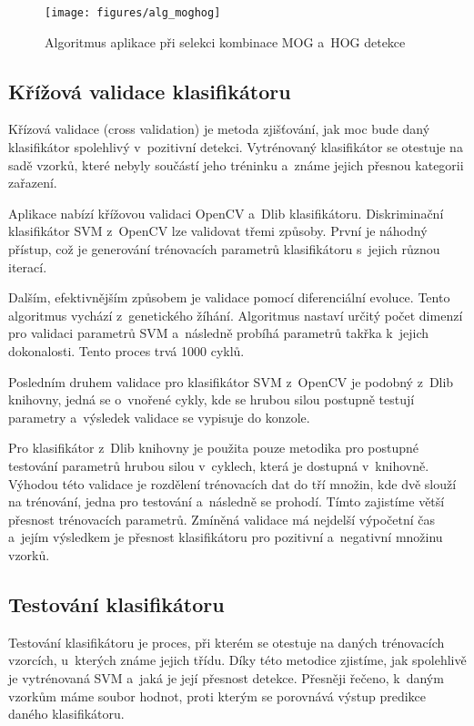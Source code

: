 \begin{figure}[H]
\centering
\texttt{[image: figures/alg\_moghog]}
\caption{Algoritmus aplikace při selekci kombinace MOG a~HOG detekce}
\label{mog_algorithm}
\end{figure}

\subsection{Křížová validace klasifikátoru}
Křízová validace (cross validation) je metoda zjišťování, jak moc bude daný klasifikátor spolehlivý v~pozitivní detekci. Vytrénovaný klasifikátor se otestuje na sadě vzorků, které nebyly součástí jeho tréninku a~známe jejich přesnou kategorii zařazení.

Aplikace nabízí křížovou validaci OpenCV a~Dlib klasifikátoru. Diskriminační klasifikátor SVM z~OpenCV lze validovat třemi způsoby. První je náhodný přístup, což je generování trénovacích parametrů klasifikátoru s~jejich různou iterací.

Dalším, efektivnějším způsobem je validace pomocí diferenciální evoluce. Tento algoritmus vychází z~genetického žíhání. Algoritmus nastaví určitý počet dimenzí pro validaci parametrů SVM a~následně probíhá  parametrů takřka k~jejich dokonalosti. Tento proces trvá 1000 cyklů.

Posledním druhem validace pro klasifikátor SVM z~OpenCV je podobný z~Dlib knihovny, jedná se o~vnořené cykly, kde se hrubou silou postupně testují parametry a~výsledek validace se vypisuje do konzole. 

Pro klasifikátor z~Dlib knihovny je použita pouze metodika pro postupné testování parametrů hrubou silou v~cyklech, která je dostupná v~knihovně. Výhodou této validace je rozdělení trénovacích dat do tří množin, kde dvě slouží na trénování, jedna pro testování a~následně se prohodí. Tímto zajistíme větší přesnost trénovacích parametrů. Zmíněná validace má nejdelší výpočetní čas a~jejím výsledkem je přesnost klasifikátoru pro pozitivní a~negativní množinu vzorků.

\subsection{Testování klasifikátoru}
Testování klasifikátoru je proces, při kterém se otestuje na daných trénovacích vzorcích, u~kterých známe jejich třídu. Díky této metodice zjistíme, jak spolehlivě je vytrénovaná SVM a~jaká je její přesnost detekce. Přesněji řečeno, k~daným vzorkům máme soubor  hodnot, proti kterým se porovnává výstup predikce daného klasifikátoru. 

